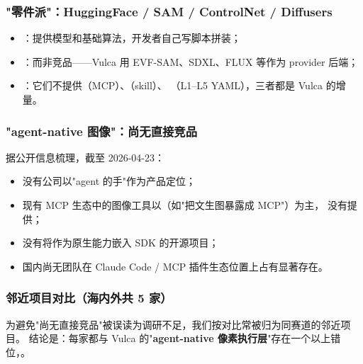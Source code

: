 \subsubsection*{"零件派"：HuggingFace / SAM / ControlNet / Diffusers}
\begin{itemize}
  \item {}：提供模型和基础算法，开发者自己写脚本拼装；
  \item {}：而非竞品——Vulca 用 EVF-SAM、SDXL、FLUX 等作为 provider 后端；
  \item {}：它们不提供（MCP）、（skill）、
  （L1–L5 YAML），三者都是 Vulca 的增量。
\end{itemize}

\subsubsection*{"agent-native 图像"：尚无直接竞品}
据公开信息梳理，截至 2026-04-23：

\begin{itemize}
  \item 没有公司以"agent 的手"作为产品定位；
  \item 现有 MCP 生态中的图像工具以（如"把文生图暴露成 MCP"）为主，
  没有提供；
  \item 没有将作为原生能力嵌入 SDK 的开源项目；
  \item 国内尚无团队在 Claude Code / MCP 插件生态位置上占有显著存在。
\end{itemize}

\subsubsection*{邻近项目对比（海内外共 5 家）}

为避免"尚无直接竞品"被误读为调研不足，我们按对比常被归为同赛道的邻近项目。
结论是：每家都与 Vulca 的"\textbf{agent-native 像素执行层}"存在一个以上错位，。


